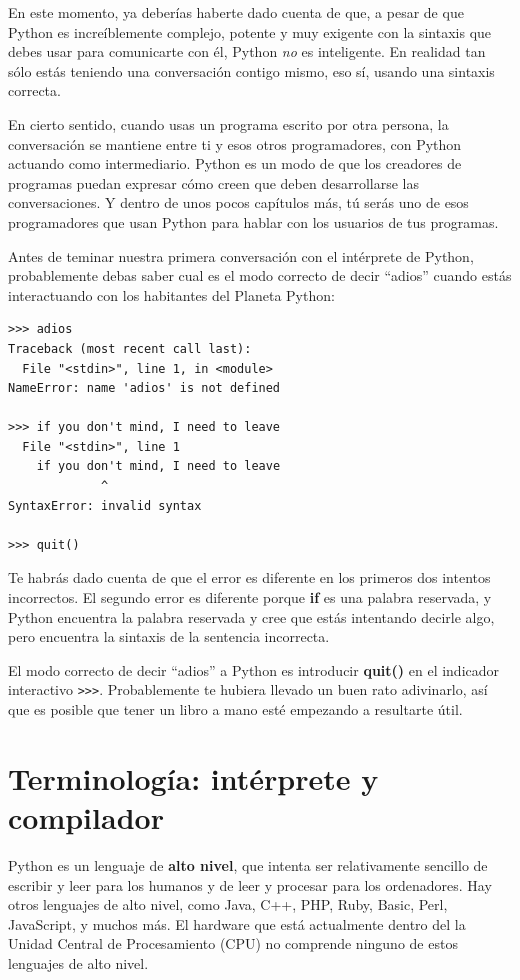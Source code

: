 En este momento, ya deberías haberte dado cuenta de que, a pesar de que Python
es increíblemente complejo, potente y muy exigente con
la sintaxis que debes usar para comunicarte con él, Python {\em no} es
inteligente. En realidad tan sólo estás teniendo una conversación
contigo mismo, eso sí, usando una sintaxis correcta.

En cierto sentido, cuando usas un programa escrito por otra persona,
la conversación se mantiene entre ti y esos otros programadores,
con Python actuando como intermediario. Python es un
modo de que los creadores de programas puedan expresar cómo creen
que deben desarrollarse las conversaciones. Y dentro
de unos pocos capítulos más, tú serás uno de esos programadores
que usan Python para hablar con los usuarios de tus programas.

Antes de teminar nuestra primera conversación con el intérprete
de Python, probablemente debas saber cual es el modo correcto
de decir ``adios'' cuando estás interactuando con los
habitantes del Planeta Python:

\beforeverb
\begin{verbatim}
>>> adios
Traceback (most recent call last):
  File "<stdin>", line 1, in <module>
NameError: name 'adios' is not defined

>>> if you don't mind, I need to leave
  File "<stdin>", line 1
    if you don't mind, I need to leave
             ^
SyntaxError: invalid syntax

>>> quit()
\end{verbatim}
\afterverb
%
Te habrás dado cuenta de que el error es diferente en los primeros
dos intentos incorrectos. El segundo error es diferente porque
{\bf if} es una palabra reservada, y Python encuentra la palabra
reservada y cree que estás intentando decirle algo, pero encuentra
la sintaxis de la sentencia incorrecta.

El modo correcto de decir ``adios'' a Python es introducir
{\bf quit()} en el indicador interactivo {\tt >>>}.
Probablemente te hubiera llevado un buen rato adivinarlo,
así que es posible que tener un libro a mano
esté empezando a resultarte útil.

\section{Terminología: intérprete y compilador}

Python es un lenguaje de {\bf alto nivel}, que intenta ser relativamente
sencillo de escribir y leer para los humanos y de leer y procesar para
los ordenadores. Hay otros lenguajes de alto nivel, como Java, C++,
PHP, Ruby, Basic, Perl, JavaScript, y muchos más. El hardware que está
actualmente dentro del la Unidad Central de Procesamiento (CPU) no comprende
ninguno de estos lenguajes de alto nivel.

